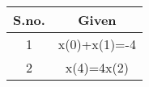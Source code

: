 \begin{tabular}{|c|c|}
    \hline
    S.no. & Given\\\hline
    1 & x(0)+x(1)=-4\\\hline
    2 & x(4)=4x(2)\\\hline 
  \end{tabular}
